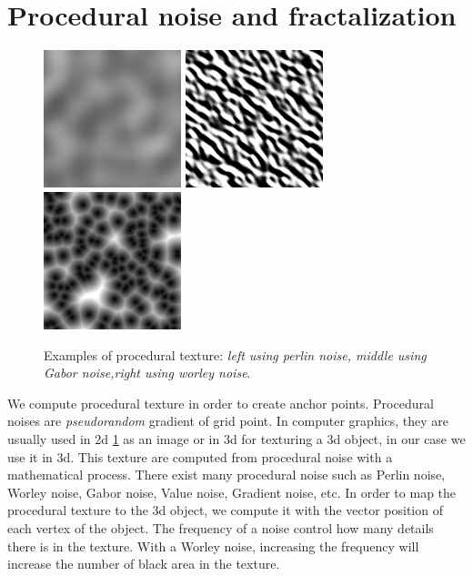 \section{Procedural noise and fractalization}

\begin{figure}
    \begin{center}
    \includegraphics[width=40mm, height=40mm]{images/PerlinNoise2d.png}
    \includegraphics[width=40mm, height=40mm]{images/GaborNoise2d.png}
    \includegraphics[width=40mm, height=40mm]{images/WorleyNoise2d.jpg}
    \end{center}
    \caption{Examples of procedural texture: \textit{left using perlin noise, middle using Gabor noise,right using worley noise}.}
    \label{procedural_texture}
\end{figure}


We compute procedural texture in order to create anchor points. Procedural noises are \textit{pseudorandom} gradient of grid point. In computer graphics, they are usually used in 2d \ref{procedural_texture} as an image or in 3d for texturing a 3d object, in our case we use it in 3d. This texture are computed from procedural noise with a mathematical process. There exist many procedural noise such as Perlin noise, Worley noise, Gabor noise, Value noise, Gradient noise, etc. In order to map the procedural texture to the 3d object, we compute it with the vector position of each vertex of the object. The frequency of a noise control how many details there is in the texture. With a Worley noise, increasing the frequency will increase the number of black area in the texture.

